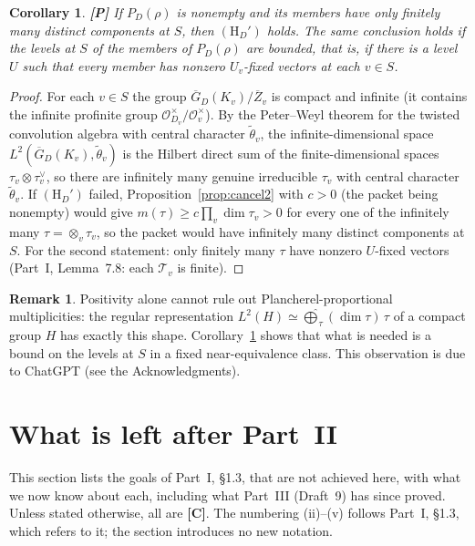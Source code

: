 \documentclass[12pt]{article}
\newcommand{\ov}[1]{\overline{#1}}
\newcommand{\cO}{\mathcal{O}}
\newcommand{\Zb}{\ov{Z}}
\newcommand{\GDb}{\ov{G}_D}
\newcommand{\Pv}{\textbf{[P]}}
\newcommand{\Cv}{\textbf{[C]}}
\theoremstyle{plain}
\newtheorem{corollary}[theorem]{Corollary}
\theoremstyle{definition}
\newtheorem{remark}[theorem]{Remark}
\begin{document}
\begin{corollary}\label{cor:finiteStypes}\Pv
If $P_D(\rho)$ is nonempty and its members have only finitely many distinct components at $S$, then $(\mathrm H_D')$ holds. The same conclusion holds if the levels at $S$ of the members of $P_D(\rho)$ are bounded, that is, if there is a level $U$ such that every member has nonzero $U_v$-fixed vectors at each $v\in S$.
\end{corollary}
\begin{proof}
For each $v\in S$ the group $\GDb(K_v)/\Zb_v$ is compact and infinite (it contains the infinite profinite group $\cO_{D_v}^\times/\cO_v^\times$). By the Peter--Weyl theorem for the twisted convolution algebra with central character $\tilde\theta_v$, the infinite-dimensional space $L^2(\GDb(K_v),\tilde\theta_v)$ is the Hilbert direct sum of the finite-dimensional spaces $\tau_v\otimes\tau_v^\vee$, so there are infinitely many genuine irreducible $\tau_v$ with central character $\tilde\theta_v$. If $(\mathrm H_D')$ failed, Proposition~\ref{prop:cancel2} with $c>0$ (the packet being nonempty) would give $m(\tau)\ge c\prod_v\dim\tau_v>0$ for every one of the infinitely many $\tau=\otimes_v\tau_v$, so the packet would have infinitely many distinct components at $S$. For the second statement: only finitely many $\tau$ have nonzero $U$-fixed vectors (Part~I, Lemma~7.8: each $\mathcal T_v$ is finite).
\end{proof}

\begin{remark}
Positivity alone cannot rule out Plancherel-proportional multiplicities: the regular representation $L^2(H)\simeq\widehat\bigoplus_\tau(\dim\tau)\,\tau$ of a compact group $H$ has exactly this shape. Corollary~\ref{cor:finiteStypes} shows that what is needed is a bound on the levels at $S$ in a fixed near-equivalence class. This observation is due to ChatGPT (see the Acknowledgments).
\end{remark}

\section{What is left after Part~II}\label{sec:partIII}
This section lists the goals of Part~I, \S1.3, that are not achieved here, with what we now know about each, including what Part~III (Draft~9) has since proved. Unless stated otherwise, all are \Cv. The numbering (ii)--(v) follows Part~I, \S1.3, which refers to it; the section introduces no new notation.
\end{document}
